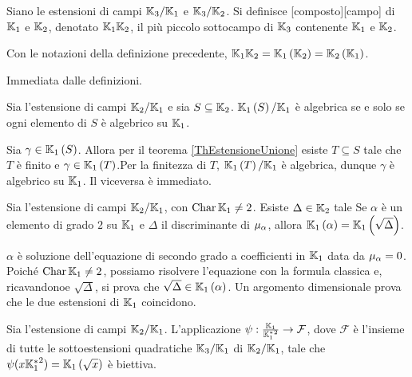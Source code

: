 \begin{Definition}
	Siano le estensioni di campi $\mathbb{K}_3/\mathbb{K}_1$ e $\mathbb{K}_3/\mathbb{K}_2$. Si definisce [composto][campo] di $\mathbb{K}_1$ e $\mathbb{K}_2$, denotato $\mathbb{K}_1\mathbb{K}_2$, il pi\`u piccolo sottocampo di $\mathbb{K}_3$ contenente $\mathbb{K}_1$ e $\mathbb{K}_2$.
\end{Definition}
\begin{Theorem}
	Con le notazioni della definizione precedente, $\mathbb{K}_1\mathbb{K}_2 = \mathbb{K}_1 \left ( \mathbb{K}_2 \right ) = \mathbb{K}_2 \left ( \mathbb{K}_1 \right )$.
\end{Theorem}
\Proof Immediata dalle definizioni. \EndProof
\begin{Theorem}\label{th_estensionealgebricamentegenerata}
	Sia l'estensione di campi $\mathbb{K}_2/\mathbb{K}_1$ e sia $S \subseteq \mathbb{K}_2$. $\mathbb{K}_1 \left ( S \right )/\mathbb{K}_1$ \`e algebrica se e solo se ogni elemento di $S$ \`e algebrico su $\mathbb{K}_1$.
\end{Theorem}
\Proof Sia $\gamma \in \mathbb{K}_1 \left ( S \right )$. Allora per il teorema \ref{ThEstensioneUnione} esiste $T \subseteq S$ tale che $T$ \`e finito e $\gamma \in \mathbb{K}_1 \left ( T \right )$.Per la finitezza di $T$, $\mathbb{K}_1 \left ( T \right )/\mathbb{K}_1$ \`e algebrica, dunque $\gamma$ \`e algebrico su $\mathbb{K}_1$. Il viceversa \`e immediato. \EndProof
\begin{Exercice}
	Sia l'estensione di campi $\mathbb{K}_2/\mathbb{K}_1$, con $\operatorname{Char} \mathbb{K}_1 \neq 2$. Esiste $\Delta \in \mathbb{K}_2$ tale Se $\alpha$ \`e un elemento di grado $2$ su $\mathbb{K}_1$ e $\Delta$ il discriminante di $\MinimalPolynomial{\alpha}$, allora $\mathbb{K}_1 \left ( \alpha \right ) = \mathbb{K}_1 \left ( \sqrt{\Delta} \right )$.
\end{Exercice}
\Solution $\alpha$ \`e soluzione dell'equazione di secondo grado a coefficienti in $\mathbb{K}_1$ data da $\MinimalPolynomial{\alpha} = 0$. Poich\'e $\operatorname{Char} \mathbb{K}_1 \neq 2$, possiamo risolvere l'equazione con la formula classica e, ricavandonoe $\sqrt{\Delta}$, si prova che $\sqrt{\Delta} \in \mathbb{K}_1 \left ( \alpha \right )$. Un argomento dimensionale prova che le due estensioni di $\mathbb{K}_1$ coincidono. \EndSolution
\begin{Exercice}
	Sia l'estensione di campi $\mathbb{K}_2/\mathbb{K}_1$. L'applicazione $\psi: \frac{\mathbb{K}_1}{{\mathbb{K}_1^*}^2} \rightarrow \mathcal{F}$, dove $\mathcal{F}$ \`e l'insieme di tutte le sottoestensioni quadratiche $\mathbb{K}_3/\mathbb{K}_1$ di $\mathbb{K}_2/\mathbb{K}_1$, tale che $\psi(x{\mathbb{K}_1^*}^2) = \mathbb{K}_1 \left ( \sqrt{x} \right )$ \`e biettiva.
\end{Exercice}
